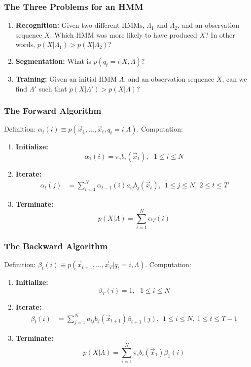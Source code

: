 \documentclass{beamer}
\begin{document}
\begin{frame}
  \frametitle{The Three Problems for an HMM}

  \begin{enumerate}
  \item {\bf Recognition:} Given two different HMMs, $\Lambda_1$ and
    $\Lambda_2$, and an observation sequence $X$.  Which HMM was more
    likely to have produced $X$?  In other words, 
    $p(X|\Lambda_1)>p(X|\Lambda_2)$?
  \item {\bf Segmentation:} What is $p(q_t=i|X,\Lambda)$?
  \item {\bf Training:} Given an initial HMM $\Lambda$, and an
    observation sequence $X$, can we find $\Lambda'$ such that
    $p(X|\Lambda') > p(X|\Lambda)$?
  \end{enumerate}
\end{frame}

\begin{frame}
  \frametitle{The Forward Algorithm}

  Definition: $\alpha_t(i) \equiv p(\vec{x}_1,\ldots,\vec{x}_t,q_t=i|\Lambda)$.  Computation:
  \begin{enumerate}
  \item {\bf Initialize:}
    \[
    \alpha_1(i) = \pi_i b_i(\vec{x}_1),~~~1\le i\le N
    \]
  \item {\bf Iterate:}
    \begin{align*}
      \alpha_{t}(j) &= \sum_{i=1}^N \alpha_{t-1}(i) a_{ij}b_j(\vec{x}_t),~~1\le j\le N,~2\le t\le T
    \end{align*}
  \item {\bf Terminate:}
    \[
    p(X|\Lambda) = \sum_{i=1}^N \alpha_T(i)
    \]
  \end{enumerate}
\end{frame}
  
\begin{frame}
  \frametitle{The Backward Algorithm}

  Definition: $\beta_t(i) \equiv p(\vec{x}_{t+1},\ldots,\vec{x}_T|q_t=i,\Lambda)$.  Computation:
  \begin{enumerate}
  \item {\bf Initialize:}
    \[
    \beta_T(i) = 1,~~~1\le i\le N
    \]
  \item {\bf Iterate:}
    \begin{align*}
      \beta_{t}(i) &= \sum_{j=1}^N a_{ij}b_j(\vec{x}_{t+1})\beta_{t+1}(j),~~1\le i\le N,~1\le t\le T-1
    \end{align*}
  \item {\bf Terminate:}
    \[
    p(X|\Lambda) = \sum_{i=1}^N \pi_ib_i(\vec{x}_1)\beta_1(i)
    \]
  \end{enumerate}
\end{frame}
\end{document}
